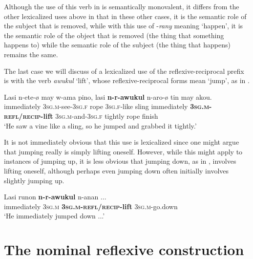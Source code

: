 \documentclass[output=paper]{langscibook}
\begin{document}
  Although the use of this verb in  is semantically monovalent, it differs from the other lexicalized uses above in that in these other cases, it is the semantic role of the subject that is removed, while with this use of -\emph{rany} meaning ‘happen’, it is the semantic role of the object that is removed (the thing that something happens to) while the semantic role of the subject (the thing that happens) remains the same.



  The last case we will discuss of a lexicalized use of the reflexive-reciprocal prefix is with the verb \emph{awukul} ‘lift’, whose reflexive-reciprocal forms mean ‘jump’, as in .

\ea%
    \label{ex:Brown:42}
    \gll Lasi  n-ete-ø  may  w-ama  pino,  lasi \textbf{n-r-awukul}  n-aro-ø  tin  may  akou.\\
 immediately  \textsc{3sg.m}{}-see-\textsc{3sg.f}  rope  \textsc{3sg.f}{}-like  sling  immediately  \textbf{\textsc{3sg.m-refl/recip-}}\textbf{lift}  \textsc{3sg.m}{}-and-\textsc{3sg.f}  tightly  rope  finish\\
    \glt ‘He saw a vine like a sling, so he jumped and grabbed it tightly.’
    \z

          




It is not immediately obvious that this use is lexicalized since one might argue that jumping really is simply lifting oneself.  However, while this might apply to instances of jumping up, it is less obvious that jumping down, as in , involves lifting oneself, although perhaps even jumping down often initially involves slightly jumping up.




\ea%
    \label{ex:Brown:43}
    \gll Lasi  runon  \textbf{n-r-awukul}  n-anan  ...\\
 immediately  \textsc{3sg.m}  \textbf{\textsc{3sg.m-refl/recip}}\textbf{{}-lift}  \textsc{3sg.m}{}-go.down  \\
    \glt  ‘He immediately jumped down ...’
    \z

          



 



\section{The nominal reflexive construction}\label{sec:Brown:5} %
\end{document}
